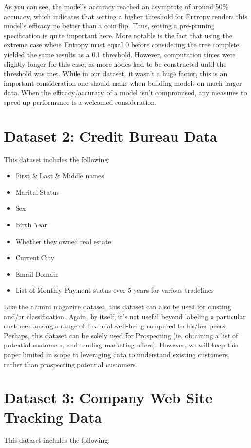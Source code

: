 \documentclass[letterpaper,12pt]{article}
\begin{document}
As you can see, the model's accuracy reached an asymptote of around 50\% accuracy, which indicates that setting a higher threshold for Entropy renders this model's efficacy no better than a coin flip.  Thus, setting a pre-pruning specification is quite important here.  More notable is the fact that using the extreme case where Entropy must equal 0 before considering the tree complete yielded the same results as a 0.1 threshold.  However, computation times were slightly longer for this case, as more nodes had to be constructed until the threshold was met.  While in our dataset, it wasn't a huge factor, this is an important consideration one should make when building models on much larger data.  When the efficacy/accuracy of a model isn't compromised, any measures to speed up performance is a welcomed consideration.  

\section{Dataset 2:  Credit Bureau Data}
This dataset includes the following:

\begin{itemize}
\item First \& Last \& Middle names
\item Marital Status
\item Sex
\item Birth Year
\item Whether they owned real estate
\item Current City
\item Email Domain
\item List of Monthly Payment status over 5 years for various tradelines
\end{itemize}

Like the alumni magazine dataset, this dataset can also be used for clusting and/or classification.  Again, by itself, it's not useful beyond labeling a particular customer among a range of financial well-being compared to his/her peers.  Perhaps, this dataset can be solely used for Prospecting (ie. obtaining a list of potential customers, and sending marketing offers).  However, we will keep this paper limited in scope to leveraging data to understand existing customers, rather than prospecting potential customers.  

\section{Dataset 3: Company Web Site Tracking Data}
This dataset includes the following:
\end{document}

